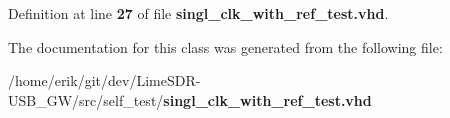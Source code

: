 Definition at line {\bf 27} of file {\bf singl\+\_\+clk\+\_\+with\+\_\+ref\+\_\+test.\+vhd}.



The documentation for this class was generated from the following file\+:\begin{DoxyCompactItemize}
\item 
/home/erik/git/dev/\+Lime\+S\+D\+R-\/\+U\+S\+B\+\_\+\+G\+W/src/self\+\_\+test/{\bf singl\+\_\+clk\+\_\+with\+\_\+ref\+\_\+test.\+vhd}\end{DoxyCompactItemize}
